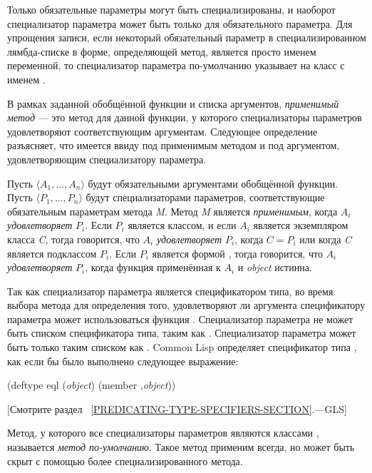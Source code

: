 Только обязательные параметры могут быть специализированы, и наоборот
специализатор параметра может быть только для обязательного параметра. Для
упрощения записи, если некоторый обязательный параметр в специализированном
лямбда-списке в форме, определяющей метод, является просто именем переменной, то
специализатор параметра по-умолчанию указывает на класс с именем .

В рамках заданной обобщённой функции и списка аргументов, \emph{применимый
  метод} --- это метод для данной функции, у которого специализаторы параметров
удовлетворяют соответствующим аргументам. Следующее определение разъясняет, что
имеется ввиду под применимым методом и под аргументом, удовлетворяющим
специализатору параметра.

Пусть $\langle A_1, \ldots, A_{n}\rangle$ будут обязательными аргументами
обобщённой функции. Пусть $\langle P_1, \ldots, P_{n}\rangle$ будут
специализаторами параметров, соответствующие обязательным параметрам метода
\emph{M}. Метод \emph{M} является \emph{применимым}, когда $A_{i}$
\emph{удовлетворяет} $P_{i}$. Если $P_{i}$ является классом, и если $A_{i}$
является экземпляром класса \emph{C}, тогда говорится, что $A_{i}$
\emph{удовлетворяет} $P_{i}$, когда $C=P_{i}$ или когда \emph{C} является
подклассом $P_{i}$. Если $P_{i}$ является формой ,
тогда говорится, что $A_{i}$ \emph{удовлетворяет} $P_{i}$, когда функция
 применённая к $A_{i}$ и \emph{object} истинна.

Так как специализатор параметра является спецификатором типа, во время выбора
метода для определения того, удовлетворяют ли аргумента спецификатору параметра
может использоваться функция . Специализатор параметра не может быть
списком спецификатора типа, таким как . Специализатор параметра может быть только таким списком как
. Common Lisp определяет спецификатор типа
, как если бы было выполнено следующее выражение:

\begin{lisp}
(deftype eql (\emph{object}) {\Xbq}(member ,\emph{object}))
\end{lisp}
[Смотрите раздел ~\ref{PREDICATING-TYPE-SPECIFIERS-SECTION}.---GLS]

Метод, у которого все специализаторы параметров являются классами ,
называется \emph{метод по-умолчанию}. Такое метод применим всегда, но может быть
скрыт с помощью более специализированного метода.

